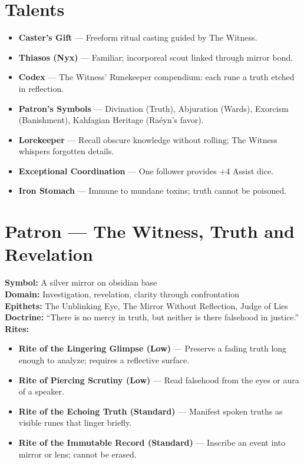 \documentclass[11pt]{article}
\begin{document}
\section*{Talents}
\begin{itemize}
  \item \textbf{Caster’s Gift} — Freeform ritual casting guided by The Witness.
  \item \textbf{Thiasos (Nyx)} — Familiar; incorporeal scout linked through mirror bond.
  \item \textbf{Codex} — The Witness’ Runekeeper compendium: each rune a truth etched in reflection.
  \item \textbf{Patron’s Symbols} — Divination (Truth), Abjuration (Wards), Exorcism (Banishment), Kahfagian Heritage (Raéyn’s favor).
  \item \textbf{Lorekeeper} — Recall obscure knowledge without rolling; The Witness whispers forgotten details.
  \item \textbf{Exceptional Coordination} — One follower provides +4 Assist dice.
  \item \textbf{Iron Stomach} — Immune to mundane toxins; truth cannot be poisoned.
\end{itemize}

\section*{Patron — The Witness, Truth and Revelation}
\textbf{Symbol:} A silver mirror on obsidian base\\
\textbf{Domain:} Investigation, revelation, clarity through confrontation\\
\textbf{Epithets:} The Unblinking Eye, The Mirror Without Reflection, Judge of Lies\\
\textbf{Doctrine:} “There is no mercy in truth, but neither is there falsehood in justice.”\\[4pt]
\textbf{Rites:}
\begin{itemize}
  \item \textbf{Rite of the Lingering Glimpse (Low)} — Preserve a fading truth long enough to analyze; requires a reflective surface.
  \item \textbf{Rite of Piercing Scrutiny (Low)} — Read falsehood from the eyes or aura of a speaker.
  \item \textbf{Rite of the Echoing Truth (Standard)} — Manifest spoken truths as visible runes that linger briefly.
  \item \textbf{Rite of the Immutable Record (Standard)} — Inscribe an event into mirror or lens; cannot be erased.
\end{itemize}
\end{document}
